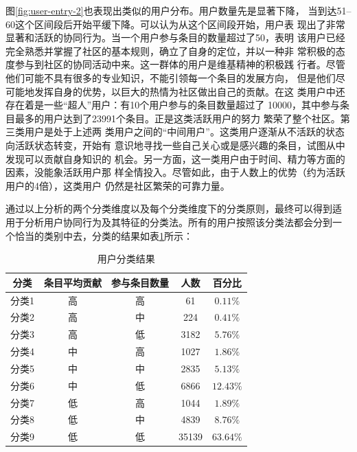 图\ref{fig:user-entry-2}也表现出类似的用户分布。用户数量先是显著下降，
当到达51--60这个区间段后开始平缓下降。可以认为从这个区间段开始，用户表
现出了非常显著和活跃的协同行为。当一个用户参与条目的数量超过了50，表明
该用户已经完全熟悉并掌握了社区的基本规则，确立了自身的定位，并以一种非
常积极的态度参与到社区的协同活动中来。这一群体的用户是维基精神的积极践
行者。尽管他们可能不具有很多的专业知识，不能引领每一个条目的发展方向，
但是他们尽可能地发挥自身的优势，以巨大的热情为社区做出自己的贡献。在这
类用户中还存在着是一些“超人”用户：有10个用户参与的条目数量超过了
10000，其中参与条目最多的用户达到了23991个条目。正是这类活跃用户的努力
繁荣了整个社区。第三类用户是处于上述两
类用户之间的“中间用户”。这类用户逐渐从不活跃的状态向活跃状态转变，开始有
意识地寻找一些自己关心或是感兴趣的条目，试图从中发现可以贡献自身知识的
机会。另一方面，这一类用户由于时间、精力等方面的因素，没能象活跃用户那
样全情投入。尽管如此，由于人数上的优势（约为活跃用户的4倍），这类用户
仍然是社区繁荣的可靠力量。

通过以上分析的两个分类维度以及每个分类维度下的分类原则，最终可以得到适
用于分析用户协同行为及其特征的分类法。所有的用户按照该分类法都会分到一
个恰当的类别中去，分类的结果如表\ref{tab:category}所示：
\begin{table}[htb]
  \centering
 \small
 \caption{\small{用户分类结果}}
  \begin{tabular}{|c|c|c|c|c|}
\hline
    分类&条目平均贡献&参与条目数量&人数&百分比\\\hline
    分类1&高&高&61&$0.11\%$\\\hline
    分类2&高&中&224&$0.41\%$\\\hline
    分类3&高&低&3182&$5.76\%$\\\hline
    分类4&中&高&1027&$1.86\%$\\\hline
    分类5&中&中&2835&$5.13\%$\\\hline
    分类6&中&低&6866&$12.43\%$\\\hline
    分类7&低&高&1044&$1.89\%$\\\hline
    分类8&低&中&4839&$8.76\%$\\\hline
    分类9&低&低&35139&$63.64\%$\\\hline
  \end{tabular}
 
  \label{tab:category}
\end{table}

